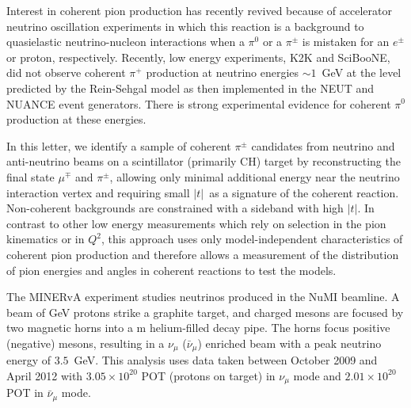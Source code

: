 \documentclass[aps,prl,twocolumn,showpacs,superscriptaddress,nofootinbib]{revtex4}
\newcommand{\minerva}{MINERvA\xspace}
\newcommand{\nubar}{\ensuremath{\bar{\nu}}}
\newcommand{\tcoh}{\ensuremath{\left| t\right| \xspace}}
\begin{document}
Interest in coherent pion production has recently revived because
of accelerator neutrino oscillation experiments\cite{Oyama:1998bd,
Michael:2008bc, Abe:2011ks, Ayres:2004js} in which this reaction is a background to quasielastic
neutrino-nucleon interactions when a $\pi^0$ or a $\pi^\pm$ is
mistaken for an $e^\pm$ or proton, respectively.  Recently, 
low energy experiments, K2K\cite{Hasegawa:2005td} and
SciBooNE\cite{Hiraide:2008eu}, did not observe coherent $\pi^+$
production at neutrino energies $\sim 1$~GeV at the level predicted by
the Rein-Sehgal model\cite{Rein:1982pf} as then implemented in the
NEUT\cite{Hayato:2009zz} and NUANCE\cite{Casper:2002sd} event generators. There
is strong experimental evidence for coherent $\pi^0$ production at
these energies\cite{AguilarArevalo:2008xs,Kurimoto:2010rc}.

In this letter, we identify a sample of coherent
$\pi^\pm$ candidates from neutrino and anti-neutrino beams on a
scintillator (primarily CH) target by reconstructing the final state
$\mu^\mp$ and $\pi^\pm$, allowing only minimal additional energy near the
neutrino interaction vertex and requiring small \tcoh\ as a signature of the coherent reaction.  Non-coherent backgrounds are constrained with a sideband with 
high \tcoh.  In contrast to other low energy
measurements\cite{Hasegawa:2005td, Hiraide:2008eu, AguilarArevalo:2008xs,Kurimoto:2010rc, T2K-INGRID-coh,Acciarri:2014eit}
which rely on selection in the pion kinematics or in $Q^2$, this
approach uses only model-independent characteristics of coherent pion
production and therefore allows a measurement of the distribution of pion
energies and angles in coherent reactions to test the models.



The \minerva experiment studies neutrinos produced in the NuMI
beamline\cite{Anderson:1998zza}. A beam of \unit[120]{GeV} protons 
strike a graphite target, and charged mesons are focused by two magnetic horns into a \unit[675]{m} 
helium-filled decay pipe.  The horns focus positive (negative)
mesons, resulting in a $\nu_\mu$ ($\nubar_\mu$) enriched beam with a peak neutrino energy of $3.5$~GeV.
This analysis uses data taken between October 2009 and
April 2012 with $3.05\times 10^{20}$ POT (protons on target) in $\nu_\mu$ mode and $2.01\times 10^{20}$ POT in $\nubar_\mu$ mode.   
\end{document}
